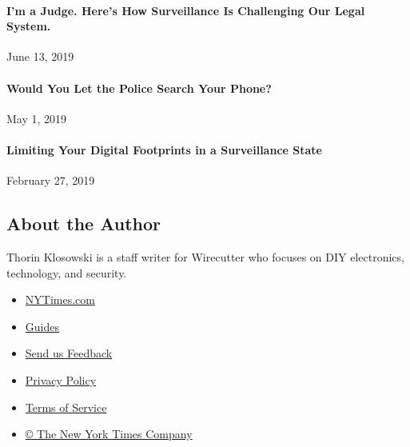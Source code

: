 \hypertarget{im-a-judge-heres-how-surveillance-is-challenging-our-legal-system}{%
\paragraph{I'm a Judge. Here's How Surveillance Is Challenging Our Legal
System.}\label{im-a-judge-heres-how-surveillance-is-challenging-our-legal-system}}

June 13, 2019

\href{https://www.nytimes.com/2019/04/30/opinion/police-phone-privacy.html}{}

\hypertarget{would-you-let-the-police-search-your-phone}{%
\paragraph{Would You Let the Police Search Your
Phone?}\label{would-you-let-the-police-search-your-phone}}

May 1, 2019

\href{https://www.nytimes.com/2019/02/27/technology/personaltech/digital-footprint-surveillance.html}{}

\hypertarget{limiting-your-digital-footprints-in-a-surveillance-state}{%
\paragraph{Limiting Your Digital Footprints in a Surveillance
State}\label{limiting-your-digital-footprints-in-a-surveillance-state}}

February 27, 2019

\hypertarget{about-the-author}{%
\subsection{About the Author}\label{about-the-author}}

Thorin Klosowski is a staff writer for Wirecutter who focuses on DIY
electronics, technology, and security.~

\begin{itemize}
\tightlist
\item
  \href{https://www.nytimes.com}{NYTimes.com}
\item
  \href{//www.nytimes.com/spotlight/guides}{Guides}
\item
  \href{https://nyt.qualtrics.com/jfe/form/SV_7VuAQJbpWqaxzUh?AGENT_ID=}{Send
  us Feedback}
\end{itemize}

\begin{itemize}
\tightlist
\item
  \href{http://www.nytimes.com/privacy}{Privacy Policy}
\item
  \href{http://www.nytimes.com/ref/membercenter/help/agree.html}{Terms
  of Service}
\item
  \href{http://www.nytimes.com/content/help/rights/copyright/copyright-notice.html}{©
  The New York Times Company}
\end{itemize}
